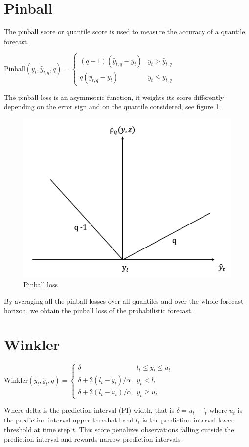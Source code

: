 \section{Pinball}\label{pinball}
The pinball score or quantile score is used to measure the accuracy of a quantile forecast.
\begin{definition}
    $\mathrm{Pinball}(y_{t},\hat{y}_{t,q},q)=
\begin{cases}
(q-1)(\hat{y}_{t,q}-y_{t}) & y_t > \hat{y}_{t,q} \\
q(\hat{y}_{t,q}-y_t) & y_t \leq \hat{y}_{t,q}
\end{cases}$
\end{definition}
The pinball loss is an asymmetric function, it weights its score differently depending on the error sign and on the quantile considered, see figure \ref{fig:pinball}.
\begin{figure}
    \includegraphics[width=\textwidth]{images/pinball_loss.png}
    \caption{Pinball loss}
    \label{fig:pinball}
  \end{figure}
By averaging all the pinball losses over all quantiles and over the whole forecast horizon, we obtain the pinball loss of the probabilistic forecast.
\section{Winkler}
\begin{definition}
    $\mathrm{Winkler}(y_t, \hat{y}_t,q)=\begin{cases}
        \delta & l_{t}\leq y_{t}\leq u_{t}\\
        \delta+2(l_{t}-y_{t})/\alpha & y_{t}< l_{t}\\
        \delta+2(l_{t}-u_{t})/\alpha & y_{t} \geq u_{t}
    \end{cases}$
\end{definition}
Where delta is the prediction interval (PI) width, that is $\delta=u_t-l_t$ where $u_t$ is the prediction interval upper threshold and $l_t$ is the prediction interval lower threshold at time step $t$. This score penalizes observations falling outside the prediction interval and rewards narrow prediction intervals.
